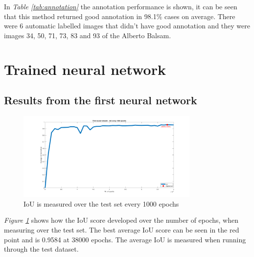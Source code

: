 \begin{table}[h]
\caption{Annotation on the automatically generated dataset with one object in the bin }
\label{tab:annotation}
\end{table}

In \textit{Table \ref{tab:annotation}} the annotation performance is shown, it can be seen that this method returned good annotation in 98.1\% cases on average. There were 6 automatic labelled images that didn’t have good annotation and they were images 34, 50, 71, 73, 83 and 93 of the Alberto Balsam.
\clearpage
\section{Trained neural network}
\subsection{Results from the first neural network}
\begin{figure}[h]
    \centering
    \includegraphics[width=0.8\textwidth, trim={5cm 0 4cm 0},clip]{graphics/results/neuralnetworkauto.png}
    \caption{IoU is measured over the test set every 1000 epochs}
    \label{fig:neuralnetwork}
\end{figure}
\textit{Figure \ref{fig:neuralnetwork}} shows how the IoU score developed over the number of epochs, when measuring over the test set. The best average IoU score can be seen in the red point and is 0.9584 at 38000 epochs. The average IoU is measured when running through the test dataset.

